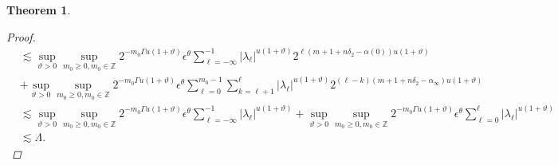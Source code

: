 \documentclass[oneside,reqno]{amsart}
\newtheorem{theorem}{Theorem}[section]
\numberwithin{equation}{section}
\theoremstyle{definition}
\begin{document}
\begin{theorem}
\begin{proof}
\begin{align*}
&\lesssim  \sup_{\vartheta>0 }\sup _{m_0\geq 0, m_0\in  \mathbb{Z}} 2^{-m_0\Gamma u(1+\vartheta)} \epsilon  ^\theta \sum_{\ell=-\infty }^{-1}\left|\lambda_\ell \right|^{u(1+\vartheta)} 2^{\ell \left(m+1+n \delta_{2}-\alpha(0)\right) u(1+\vartheta)} \\
& +\sup_{\vartheta>0 }\sup _{m_0\geq 0, m_0\in  \mathbb{Z}} 2^{-m_0\Gamma u(1+\vartheta)} \epsilon  ^\theta\sum_{\ell=0}^{m_0-1} \sum_{k=\ell+1}^{\ell }\left|\lambda_\ell \right|^{u(1+\vartheta)} 2^{(\ell-k)\left(m+1+n \delta_{2}-\alpha_{\infty}\right) u(1+\vartheta)} \\
&\lesssim   \sup_{\vartheta>0 }\sup _{m_0\geq 0, m_0\in  \mathbb{Z}} 2^{-m_0\Gamma u(1+\vartheta)} \epsilon  ^\theta \sum_{\ell=-\infty }^{-1}\left|\lambda_\ell \right|^{u(1+\vartheta)}+\sup_{\vartheta>0 }\sup _{m_0\geq 0, m_0\in  \mathbb{Z}} 2^{-m_0\Gamma u(1+\vartheta)} \epsilon  ^\theta\sum_{\ell=0}^{\ell }\left|\lambda_\ell \right|^{u(1+\vartheta)} \\
& \lesssim \Lambda .
\end{align*}







\end{proof}
\end{theorem}
\end{document}
